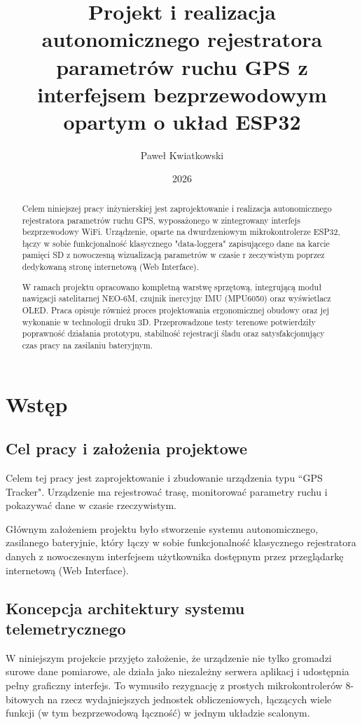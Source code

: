 \documentclass[12pt, a4paper]{EE-dyplom}
\title{Projekt i realizacja autonomicznego rejestratora parametrów ruchu GPS z interfejsem bezprzewodowym opartym o układ ESP32}
\author{Paweł Kwiatkowski}
\date{2026}
\begin{document}
\maketitle

\newpage

\begin{abstract}
Celem niniejszej pracy inżynierskiej jest zaprojektowanie i realizacja autonomicznego 
rejestratora parametrów ruchu GPS, wyposażonego w zintegrowany interfejs bezprzewodowy WiFi. 
Urządzenie, oparte na dwurdzeniowym mikrokontrolerze ESP32, łączy w sobie funkcjonalność klasycznego
 "data-loggera" zapisującego dane na karcie pamięci SD z nowoczesną wizualizacją parametrów w czasie r
 zeczywistym poprzez dedykowaną stronę internetową (Web Interface).

W ramach projektu opracowano kompletną warstwę sprzętową, integrującą moduł nawigacji satelitarnej 
NEO-6M, czujnik inercyjny IMU (MPU6050) oraz wyświetlacz OLED. Praca opisuje również 
proces projektowania ergonomicznej obudowy  oraz jej wykonanie w technologii druku 3D. 
Przeprowadzone testy terenowe potwierdziły poprawność działania prototypu, stabilność rejestracji śladu 
oraz satysfakcjonujący czas pracy na zasilaniu bateryjnym.
\end{abstract}
\newpage

\tableofcontents
\newpage
\section{Wstęp}
\subsection{Cel pracy i założenia projektowe}

Celem tej pracy jest zaprojektowanie i 
zbudowanie urządzenia typu “GPS Tracker". Urządzenie ma rejestrować trasę,
monitorować parametry ruchu i pokazywać dane w czasie rzeczywistym.

Głównym założeniem projektu było stworzenie systemu autonomicznego, 
zasilanego bateryjnie, który łączy w sobie funkcjonalność klasycznego rejestratora danych 
 z nowoczesnym interfejsem użytkownika dostępnym przez przeglądarkę 
internetową (Web Interface).

\subsection{Koncepcja architektury systemu telemetrycznego}

W niniejszym projekcie przyjęto założenie, że urządzenie nie tylko gromadzi surowe dane pomiarowe, 
ale działa jako  niezależny serwera aplikacj i udostępnia pełny graficzny interfejs. 
To wymusiło rezygnację z prostych mikrokontrolerów 8-bitowych na rzecz wydajniejszych jednostek obliczeniowych,
łączących wiele funkcji (w tym bezprzewodową łączność) w jednym układzie scalonym.
\end{document}
